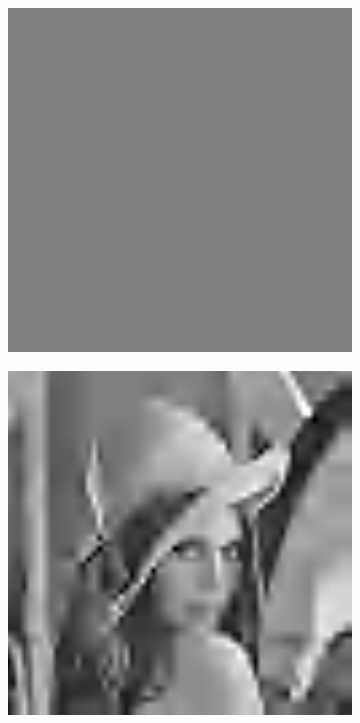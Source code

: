 \documentclass{article}
\begin{document}
\begin{figure}[htbp]
    \centering
    \begin{subfigure}{.19\textwidth}
        \includegraphics[width=\linewidth]{img/jpeg2000/0.jpg}
    \end{subfigure}
    \begin{subfigure}{.19\textwidth}
        \includegraphics[width=\linewidth]{img/jpeg2000/10.jpg}

\end{subfigure}
\end{figure}
\end{document}
